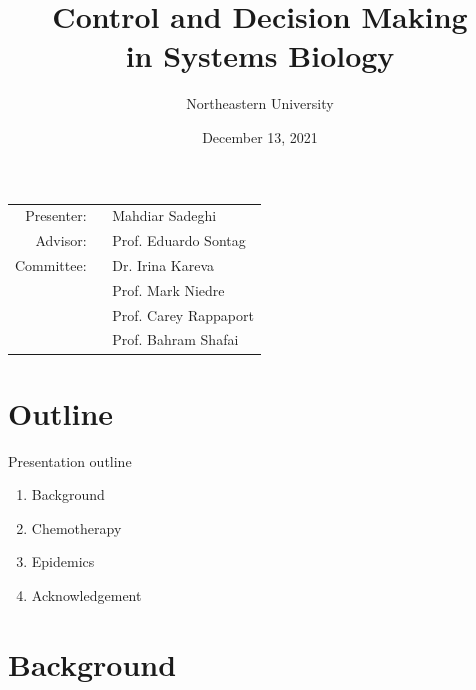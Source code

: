 \documentclass[10pt]{beamer}
\title[Proposal Review]{Control and Decision Making \\ in Systems Biology}
\author{Northeastern University}
\date{December 13, 2021}
\begin{document}
\begin{frame}
	\maketitle
	\small \hspace{3cm}
	{\begin{tabular}{r@{}l}
			Presenter: \ & Mahdiar Sadeghi \\
			Advisor:   \  & Prof. Eduardo Sontag \\
			Committee: \  & Dr. Irina Kareva \\
			& Prof. Mark Niedre \\
			& Prof. Carey Rappaport \\
			& Prof. Bahram Shafai
		\end{tabular}
	}
\end{frame}

\section{Outline}

\begin{frame}{Presentation outline}
	\vspace{5pt}
    \begin{enumerate}
    	\item Background     \vspace{0.2cm}
    	\item Chemotherapy \vspace{0.2cm}
    	\item Epidemics        \vspace{0.2cm}
    	\item Acknowledgement
    \end{enumerate}
\end{frame}

\section{Background}
\end{document}
